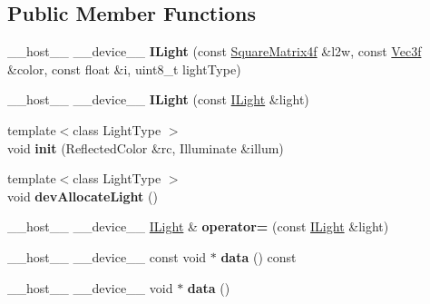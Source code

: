 \subsection*{Public Member Functions}
\begin{DoxyCompactItemize}
\item 
\+\_\+\+\_\+host\+\_\+\+\_\+ \+\_\+\+\_\+device\+\_\+\+\_\+ {\bfseries I\+Light} (const \hyperlink{class_square_matrix4}{Square\+Matrix4f} \&l2w, const \hyperlink{class_vec3}{Vec3f} \&color, const float \&i, uint8\+\_\+t light\+Type)\hypertarget{class_i_light_aa788ba40470cbbd251cf06b9a80c7a77}{}\label{class_i_light_aa788ba40470cbbd251cf06b9a80c7a77}

\item 
\+\_\+\+\_\+host\+\_\+\+\_\+ \+\_\+\+\_\+device\+\_\+\+\_\+ {\bfseries I\+Light} (const \hyperlink{class_i_light}{I\+Light} \&light)\hypertarget{class_i_light_ae44c2228daf4c95f4df2fea3c50c8abf}{}\label{class_i_light_ae44c2228daf4c95f4df2fea3c50c8abf}

\item 
{\footnotesize template$<$class Light\+Type $>$ }\\void {\bfseries init} (Reflected\+Color \&rc, Illuminate \&illum)\hypertarget{class_i_light_a3c93b73052074a1dc80d6a18f027e8e1}{}\label{class_i_light_a3c93b73052074a1dc80d6a18f027e8e1}

\item 
{\footnotesize template$<$class Light\+Type $>$ }\\void {\bfseries dev\+Allocate\+Light} ()\hypertarget{class_i_light_a1c67d8cf9d7492c1ff61c156abaa0323}{}\label{class_i_light_a1c67d8cf9d7492c1ff61c156abaa0323}

\item 
\+\_\+\+\_\+host\+\_\+\+\_\+ \+\_\+\+\_\+device\+\_\+\+\_\+ \hyperlink{class_i_light}{I\+Light} \& {\bfseries operator=} (const \hyperlink{class_i_light}{I\+Light} \&light)\hypertarget{class_i_light_a9852bdb910c17654c08b76a9df20fd25}{}\label{class_i_light_a9852bdb910c17654c08b76a9df20fd25}

\item 
\+\_\+\+\_\+host\+\_\+\+\_\+ \+\_\+\+\_\+device\+\_\+\+\_\+ const void $\ast$ {\bfseries data} () const\hypertarget{class_i_light_aab75634731a67d8d1802044c34d1facd}{}\label{class_i_light_aab75634731a67d8d1802044c34d1facd}

\item 
\+\_\+\+\_\+host\+\_\+\+\_\+ \+\_\+\+\_\+device\+\_\+\+\_\+ void $\ast$ {\bfseries data} ()\hypertarget{class_i_light_ac22951f44f0e03cd4552cee51daad9f8}{}\label{class_i_light_ac22951f44f0e03cd4552cee51daad9f8}

\end{DoxyCompactItemize}

